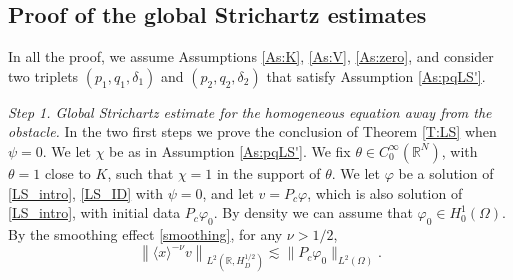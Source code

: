 \documentclass[10pt,leqno]{amsart}
\theoremstyle{definition}%
\theoremstyle{remark}
\numberwithin{equation}{section}
\newcommand{\R}{\mathbb{R}}
\renewcommand{\^}{\widehat}%
\newcommand{\la}{\langle}
\newcommand{\ra}{\rangle}
\begin{document}
\subsection{Proof of the global Strichartz estimates}
\label{sub:Strichartz}
In all the proof, we assume Assumptions \ref{As:K}, \ref{As:V}, \ref{As:zero}, and consider two triplets $(p_1,q_1,\delta_1)$ and $(p_2,q_2,\delta_2)$ that satisfy Assumption \ref{As:pqLS'}.


\emph{Step 1. Global Strichartz estimate for the homogeneous equation away from the obstacle.} In the two first steps we prove the conclusion of Theorem \ref{T:LS} when $\psi=0$. We let $\chi$ be as in Assumption \ref{As:pqLS'}. We fix $\theta\in C_0^{\infty}(\R^N)$, with $\theta=1$ close to $K$, such that $\chi=1$ in the support of $\theta$. We let $\varphi$ be a solution of \eqref{LS_intro}, \eqref{LS_ID} with $\psi=0$, and let $v=P_c\varphi$, which is also solution of \eqref{LS_intro}, with initial data $P_c\varphi_0$. By density we can assume that $\varphi_0\in H_0^{1}(\Omega)$. By the smoothing effect \eqref{smoothing}, for any $\nu>1/2$,
\begin{equation}
\label{vH1/2}
\left\|\la x\ra^{-\nu} v\right\|_{L^2(\R,H^{1/2}_D)}\lesssim \|P_c\varphi_0\|_{L^2(\Omega)}.
\end{equation}
\end{document}

